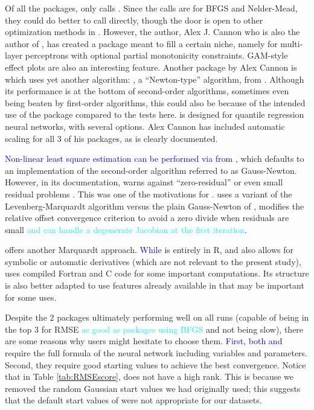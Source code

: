 Of all the packages, only  \citep{R-monmlp} calls
. Since the calls are for BFGS and Nelder-Mead, they could
do better to call  directly, though the door is open to
other optimization methods in . However, the author, Alex J.
Cannon who is also the author of , has created a package
meant to fill a certain niche, namely for multi-layer perceptrons with
optional partial monotonicity constraints. GAM-style effect plots are
also an interesting feature. Another package by Alex Cannon is
 \citep{R-qrnn} which uses yet another algorithm: ,
a ``Newton-type'' algorithm, from . Although its performance
is at the bottom of second-order algorithms, sometimes even being beaten
by first-order algorithms, this could also be because of the intended
use of the package compared to the tests here.  is designed
for quantile regression neural networks, with several options. Alex
Cannon has included automatic scaling for all 3 of his packages, as is
clearly documented.

\textcolor{blue}{Non-linear least square estimation can be performed via  from },
which defaults to an implementation of the second-order algorithm
referred to as Gauss-Newton. However, in its documentation, 
warns against ``zero-residual'' or even small residual problems
\citep[Section 6.4.1]{Nash-nlpor14}. This was one of the motivations for
 \citep{R-nlsr}.  uses a variant
\citep{jn77ima} of the Levenberg-Marquardt algorithm versus the plain
Gauss-Newton of , modifies the relative offset convergence
criterion to avoid a zero divide when residuals are small
\textcolor{cyan}{and can handle a degenerate Jacobian at the
first iteration}.

 \citep{minpack.lm} offers another Marquardt approach.
\textcolor{blue}{While}  is entirely in R, and also allows for
symbolic or automatic derivatives (which are not relevant to the present
study),  uses compiled \textsf{Fortran} and \textsf{C}
code for some important computations. Its structure is also better
adapted to use features already available in  that may be
important for some uses.

Despite the 2 packages ultimately performing well on all runs (capable
of being in the top 3 for RMSE
\textcolor{cyan}{as good as packages using BFGS} and not being slow),
there are some reasons why users might hesitate to choose them.
\textcolor{blue}{First, both  and } require
the full formula of the neural network including variables and
parameters. Second, they require good starting values to achieve the
best convergence. Notice that in Table \ref{tab:RMSEscore},
 does not have a high rank. This is because we removed
the random Gaussian start values we had originally used; this suggests
that the default start values of  were not appropriate
for our datasets.

